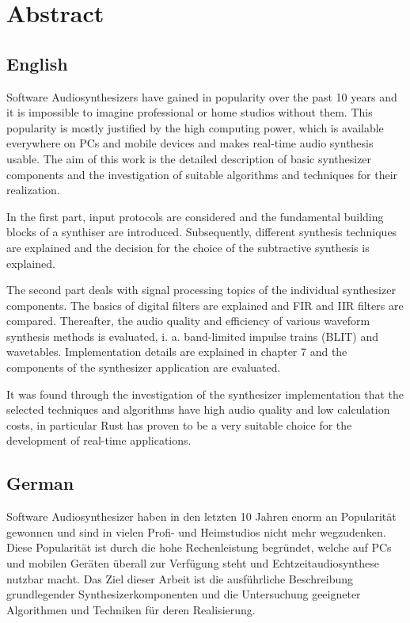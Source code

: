 \chapter*{Abstract}\label{abstract}


\section*{English}

Software Audiosynthesizers have gained in popularity over the past 10 years and it is impossible to imagine professional or home studios without them.
This popularity is mostly justified by the high computing power, which is available everywhere on PCs and mobile devices and makes real-time audio synthesis usable.
The aim of this work is the detailed description of basic synthesizer components and the investigation of suitable algorithms and techniques for their realization.

In the first part, input protocols are considered and the fundamental building blocks of a synthiser are introduced.
Subsequently, different synthesis techniques are explained and the decision for the choice of the subtractive synthesis is explained.

The second part deals with signal processing topics of the individual synthesizer components.
The basics of digital filters are explained and FIR and IIR filters are compared.
Thereafter, the audio quality and efficiency of various waveform synthesis methods is evaluated, i. a. band-limited impulse trains (BLIT) and wavetables.
Implementation details are explained in chapter 7 and the components of the synthesizer application are evaluated.

It was found through the investigation of the synthesizer implementation that the selected techniques and algorithms have high audio quality and low calculation costs, in particular Rust has proven to be a very suitable choice for the development of real-time applications.

\section*{German}

Software Audiosynthesizer haben in den letzten 10 Jahren enorm an Popularität gewonnen und sind in vielen Profi- und Heimstudios nicht mehr wegzudenken.
Diese Popularität ist durch die hohe Rechenleistung begründet, welche auf PCs und mobilen Geräten überall zur Verfügung steht und Echtzeitaudiosynthese nutzbar macht.
Das Ziel dieser Arbeit ist die ausführliche Beschreibung grundlegender Synthesizerkomponenten und die Untersuchung geeigneter Algorithmen und Techniken für deren Realisierung.

